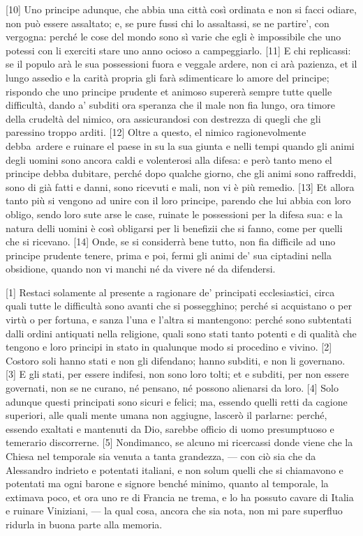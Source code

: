 {[}10{]} Uno principe adunque, che abbia una città così ordinata e non
si facci odiare, non può essere assaltato; e, se pure fussi chi lo
assaltassi, se ne partire', con vergogna: perché le cose del mondo sono
sì varie che egli è impossibile che uno potessi con li exerciti stare
uno anno ocioso a campeggiarlo. {[}11{]} E chi replicassi: se il populo
arà le sua possessioni fuora e veggale ardere, non ci arà pazienza, et
il lungo assedio e la carità propria gli farà sdimenticare lo amore del
principe; rispondo che uno principe prudente et animoso supererà sempre
tutte quelle difficultà, dando a' subditi ora speranza che il male non
fia lungo, ora timore della crudeltà del nimico, ora assicurandosi con
destrezza di quegli che gli paressino troppo arditi. {[}12{]} Oltre a
questo, el nimico ragionevolmente debba\est\ ardere e ruinare el paese in su
la sua giunta e nelli tempi quando gli animi degli uomini sono ancora
caldi e volenterosi alla difesa: e però tanto meno el principe debba
dubitare, perché dopo qualche giorno, che gli animi sono raffreddi, sono
di già fatti e danni, sono ricevuti e mali, non vi è più remedio.
{[}13{]} Et allora tanto più si vengono ad unire con il loro principe,
parendo che lui abbia con loro obligo, sendo loro sute arse le case,
ruinate le possessioni per la difesa sua: e la natura delli uomini è
così obligarsi per li benefizii che si fanno, come per quelli che si
ricevano. {[}14{]} Onde, se si considerrà bene tutto, non fia difficile
ad uno principe prudente tenere, prima e poi, fermi gli animi de' sua
ciptadini nella obsidione, quando non vi manchi né da vivere né da
difendersi.


{[}1{]} Restaci solamente al presente a ragionare de' principati
ecclesiastici, circa quali tutte le difficultà sono avanti che si
possegghino; perché si acquistano o per virtù o per fortuna, e sanza
l'una e l'altra si mantengono: perché sono subtentati dalli ordini
antiquati nella religione, quali sono stati tanto potenti e di qualità
che tengono e loro principi in stato in qualunque modo si procedino e
vivino. {[}2{]} Costoro soli hanno stati e non gli difendano; hanno
subditi, e non li governano. {[}3{]} E gli stati, per essere indifesi,
non sono loro tolti; et e subditi, per non essere governati, non se ne
curano, né pensano, né possono alienarsi da loro. {[}4{]} Solo adunque
questi principati sono sicuri e felici; ma, essendo quelli retti da
cagione superiori, alle quali mente umana non aggiugne, lascerò il
parlarne: perché, essendo exaltati e mantenuti da Dio, sarebbe officio
di uomo presumptuoso e temerario discorrerne. {[}5{]} Nondimanco, se
alcuno mi ricercassi donde viene che la Chiesa nel temporale sia venuta
a tanta grandezza, --- con ciò sia che da Alessandro indrieto e potentati
italiani, e non solum quelli che si chiamavono e potentati ma ogni
barone e signore benché minimo, quanto al temporale, la extimava poco,
et ora uno re di Francia ne trema, e lo ha possuto cavare di Italia e
ruinare Viniziani, --- la qual cosa, ancora che sia nota, non mi pare
superfluo ridurla in buona parte alla memoria.

